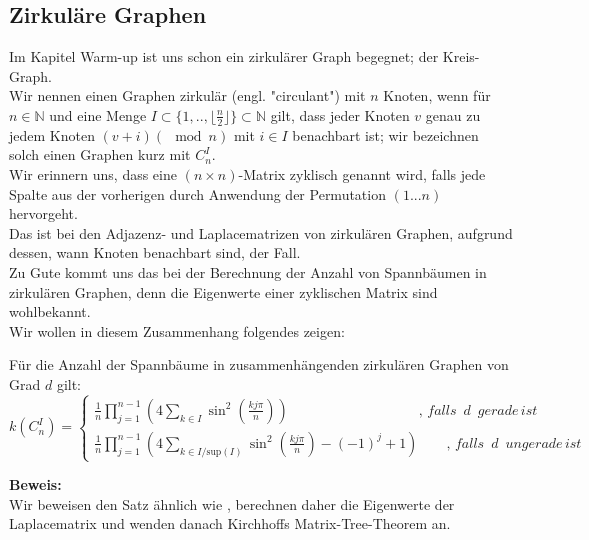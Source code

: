 \subsection{Zirkuläre Graphen}
Im Kapitel Warm-up ist uns schon ein zirkulärer Graph begegnet; der Kreis-Graph.\\
Wir nennen einen Graphen zirkulär (engl. "circulant") mit $n$ Knoten, wenn für $n \in \mathbb{N}$ und eine Menge $I \subset{\{1,..,\lfloor \frac{n}{2} \rfloor \}}\subset{\mathbb{N}}$ gilt, dass jeder Knoten $v$ genau zu jedem Knoten $(v+i) (\mod{n})$ mit $i \in I$ benachbart ist; wir bezeichnen solch einen Graphen kurz mit $C_n^I$.\\
Wir erinnern uns, dass eine $(n\times n)$-Matrix zyklisch genannt wird, falls jede Spalte aus der vorherigen durch Anwendung der Permutation $(1...n)$ hervorgeht.\\
Das ist bei den Adjazenz- und Laplacematrizen von zirkulären Graphen, aufgrund dessen, wann Knoten benachbart sind, der Fall.\\
Zu Gute kommt uns das bei der Berechnung der Anzahl von Spannbäumen in zirkulären Graphen, denn die Eigenwerte einer zyklischen Matrix sind wohlbekannt.\\
Wir wollen in diesem Zusammenhang folgendes zeigen:
\begin{Tms}
Für die Anzahl der Spannbäume in zusammenhängenden zirkulären Graphen von Grad $d$ gilt:\\
\begin{equation}
\mathit{k}\left( C_n^I \right) = 
 \begin{cases}
\frac{1}{n} \prod_{j=1}^{n-1} \left(4 \sum_{k \in I} \sin^2 \left( \frac{kj\pi}{n}\right) \right)\qquad\qquad\qquad\qquad\quad\; ,\,falls\,\,\,d\,\,\,gerade\,ist\\
\frac{1}{n} \prod_{j=1}^{n-1} \left(4 \sum_{k \in I/\mathrm{sup}(I)} \sin^2 \left( \frac{kj\pi}{n}\right)-(-1)^j+1\right)\qquad,\,falls\,\,\,d\,\,\,ungerade\,ist
\end{cases}
\end{equation}
\label{tmc}
\end{Tms}
\textbf{Beweis:}\\
Wir beweisen den Satz ähnlich wie \cite{wang_yang_1984}, berechnen daher die Eigenwerte der Laplacematrix und wenden danach Kirchhoffs Matrix-Tree-Theorem an.\\
